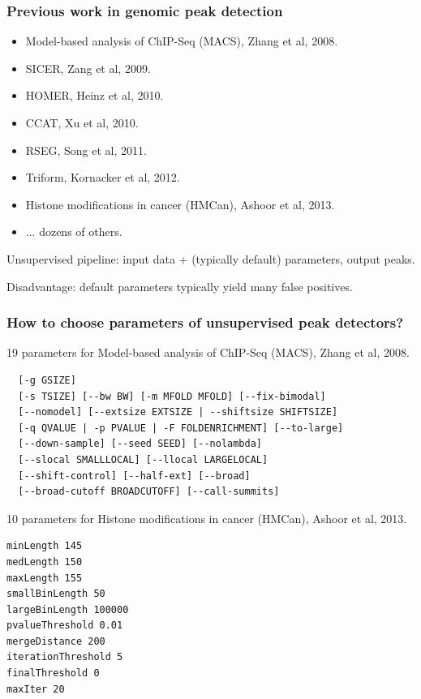 \documentclass{beamer}
\begin{document}
\begin{frame}
  \frametitle{Previous work in genomic peak detection}
  \begin{itemize}
  \item Model-based analysis of ChIP-Seq (MACS), Zhang et al, 2008.
  \item SICER, Zang et al, 2009.
  \item HOMER, Heinz et al, 2010.
  \item CCAT, Xu et al, 2010.
  \item RSEG, Song et al, 2011.
  \item Triform, Kornacker et al, 2012.
  \item Histone modifications in cancer (HMCan), Ashoor et al, 2013.
  \item ... dozens of others.
  \end{itemize}
  Unsupervised pipeline: input data + (typically default) parameters,
  output peaks.

  Disadvantage: default parameters typically yield many false
  positives.
\end{frame}

\begin{frame}[fragile]
  \frametitle{How to choose parameters of unsupervised peak
    detectors?}
\scriptsize
19 parameters for Model-based analysis of ChIP-Seq (MACS), Zhang et al, 2008.
\begin{verbatim}
  [-g GSIZE]
  [-s TSIZE] [--bw BW] [-m MFOLD MFOLD] [--fix-bimodal]
  [--nomodel] [--extsize EXTSIZE | --shiftsize SHIFTSIZE]
  [-q QVALUE | -p PVALUE | -F FOLDENRICHMENT] [--to-large]
  [--down-sample] [--seed SEED] [--nolambda]
  [--slocal SMALLLOCAL] [--llocal LARGELOCAL]
  [--shift-control] [--half-ext] [--broad]
  [--broad-cutoff BROADCUTOFF] [--call-summits]
\end{verbatim}
10 parameters for Histone modifications in cancer (HMCan),
Ashoor et al, 2013.
\begin{verbatim}
minLength 145
medLength 150
maxLength 155
smallBinLength 50
largeBinLength 100000
pvalueThreshold 0.01
mergeDistance 200
iterationThreshold 5
finalThreshold 0
maxIter 20
\end{verbatim}

\end{frame}
\end{document}
